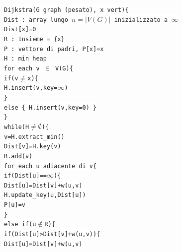 \documentclass[12pt, letterpaper]{article}
\newcommand{\codee}[1]{\colorbox{white}{\texttt{#1}}}
\begin{document}
\codee{Dijkstra(G graph (pesato), x vert)\{}\\
\hphantom{ident}\codee{Dist : array lungo $n=|V(G)|$ inizializzato a $\infty$}\\
\hphantom{ident}\codee{Dist[x]=0}\\
\hphantom{ident}\codee{R : Insieme = \{x\}}\\
\hphantom{ident}\codee{P : vettore di padri, P[x]=x}\\
\hphantom{ident}\codee{H : min heap}\\
\hphantom{ident}\codee{for each v $\in$ V(G)\{}\\
\hphantom{ident}\hphantom{ident}\codee{if(v$\ne$x)\{}\\
\hphantom{ident}\hphantom{ident}\hphantom{ident}\codee{H.insert(v,key=$\infty$)}\\
\hphantom{ident}\hphantom{ident}\codee{\}}\\
\hphantom{ident}\hphantom{ident}\codee{else \{ H.insert(v,key=0) \}}\\
\hphantom{ident}\codee{\}}\\
\hphantom{ident}\codee{while(H$\ne\emptyset$)\{}\\
\hphantom{ident}\hphantom{ident}\codee{v=H.extract\_min()}\\
\hphantom{ident}\hphantom{ident}\codee{Dist[v]=H.key(v)}\\
\hphantom{ident}\hphantom{ident}\codee{R.add(v)}\\
\hphantom{ident}\hphantom{ident}\codee{for each u adiacente di v\{}\\
\hphantom{ident}\hphantom{ident}\hphantom{ident}\codee{if(Dist[u]==$\infty$)\{}\\
\hphantom{ident}\hphantom{ident}\hphantom{ident}\hphantom{ident}\codee{Dist[u]=Dist[v]+w(u,v)}\\
\hphantom{ident}\hphantom{ident}\hphantom{ident}\hphantom{ident}\codee{H.update\_key(u,Dist[u])}\\
\hphantom{ident}\hphantom{ident}\hphantom{ident}\hphantom{ident}\codee{P[u]=v}\\
\hphantom{ident}\hphantom{ident}\hphantom{ident}\codee{\}}\\
\hphantom{ident}\hphantom{ident}\hphantom{ident}\codee{else if(u$\notin$R)\{}\\
\hphantom{ident}\hphantom{ident}\hphantom{ident}\hphantom{ident}\codee{if(Dist[u]>Dist[v]+w(u,v))\{}\\
\hphantom{ident}\hphantom{ident}\hphantom{ident}\hphantom{ident}\hphantom{ident}\codee{Dist[u]=Dist[v]+w(u,v)}\\
\end{document}
